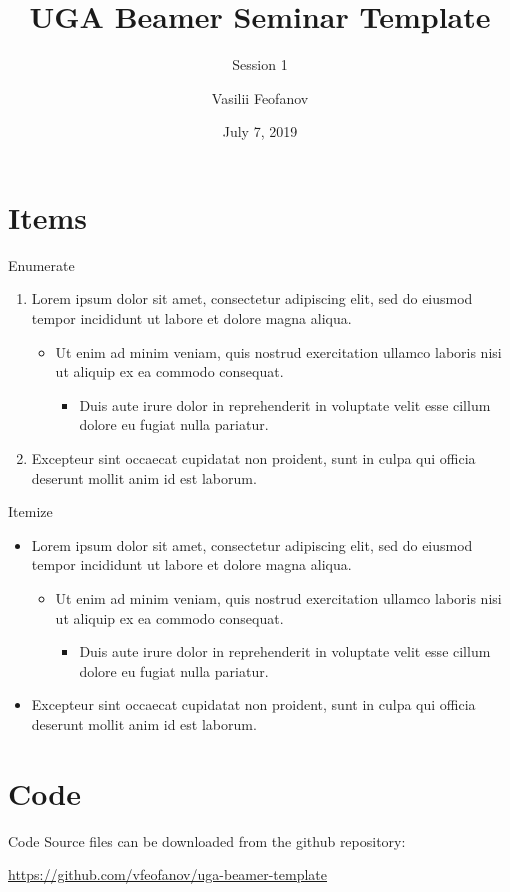 \documentclass{beamer}
\title{UGA Beamer Seminar Template}
\subtitle{Session 1}
\author[Vasilii Feofanov]{Vasilii Feofanov}
\institute{ Universit\'e Grenoble Alpes\\ \href{mailto:vasilii.feofanov@univ-grenoble-alpes.fr}{vasilii.feofanov@univ-grenoble-alpes.fr}}
\date{July 7, 2019}
\begin{document}
{
\begin{frame}
  \titlepage
\end{frame}
}
\addtocounter{framenumber}{-1}



\section{Items}
\begin{frame}{Enumerate}
    \begin{enumerate}
        \item Lorem ipsum dolor sit amet, consectetur adipiscing elit, sed do eiusmod tempor incididunt ut labore et dolore magna aliqua. 
        \begin{itemize}
            \item Ut enim ad minim veniam, quis nostrud exercitation ullamco laboris nisi ut aliquip ex ea commodo consequat.
            \begin{itemize}
            \item Duis aute irure dolor in reprehenderit in voluptate velit esse cillum dolore eu fugiat nulla pariatur. 
            \end{itemize}
        \end{itemize}
        \item Excepteur sint occaecat cupidatat non proident, sunt in culpa qui officia deserunt mollit anim id est laborum.
    \end{enumerate}
\end{frame}

\begin{frame}{Itemize}
    \begin{itemize}
        \item Lorem ipsum dolor sit amet, consectetur adipiscing elit, sed do eiusmod tempor incididunt ut labore et dolore magna aliqua. 
        \begin{itemize}
            \item Ut enim ad minim veniam, quis nostrud exercitation ullamco laboris nisi ut aliquip ex ea commodo consequat.
            \begin{itemize}
            \item Duis aute irure dolor in reprehenderit in voluptate velit esse cillum dolore eu fugiat nulla pariatur. 
            \end{itemize}
        \end{itemize}
        \item Excepteur sint occaecat cupidatat non proident, sunt in culpa qui officia deserunt mollit anim id est laborum.
    \end{itemize}
\end{frame}

\section{Code}
\begin{frame}{Code}
    Source files can be downloaded from the github repository:
    \begin{center}
        \url{https://github.com/vfeofanov/uga-beamer-template}
    \end{center}
\end{frame}
\end{document}
